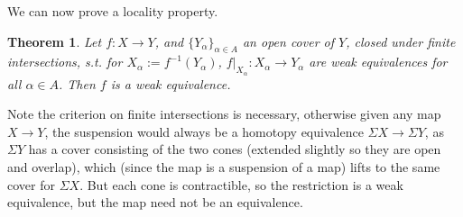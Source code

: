 \documentclass{article}
\newtheorem{theorem}{Theorem}[section]
\newtheorem{proposed work}[theorem]{Proposed Work}
\begin{document}
We can now prove a locality property.
\begin{theorem} \label{Thm:LocalWeak}
Let $f:X\to Y$, and $\{Y_\alpha\}_{\alpha \in A}$ an open cover of $Y$, closed under finite intersections, s.t. for $X_\alpha:=f^{-1}(Y_\alpha)$, $f|_{X_\alpha}: X_{\alpha} \to Y_{\alpha}$ are weak equivalences for all $\alpha \in A$. Then $f$ is a weak equivalence.
\end{theorem}

Note the criterion on finite intersections is necessary, otherwise given any map $X\to Y$, the suspension would always be a homotopy equivalence $\Sigma X \to \Sigma Y$, as $\Sigma Y$ has a cover consisting of the two cones (extended slightly so they are open and overlap), which (since the map is a suspension of a map) lifts to the same cover for $\Sigma X$. But each cone is contractible, so the restriction is a weak equivalence, but the map need not be an equivalence.
\end{document}
